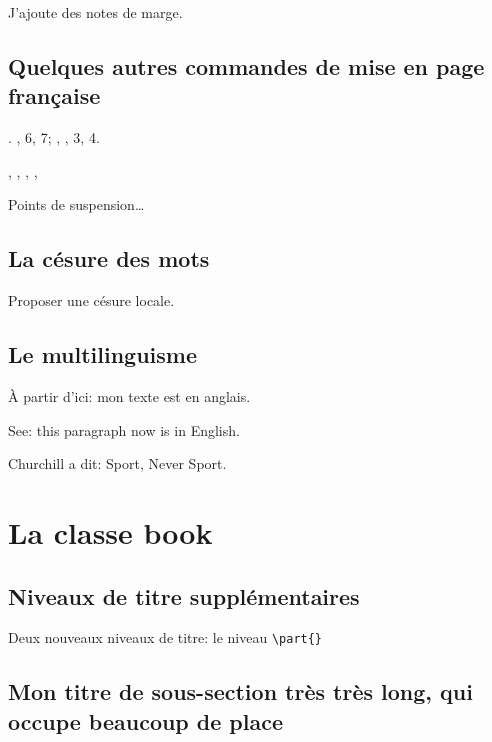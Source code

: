 \documentclass[12pt,a4paper]{book} %
\begin{document}
\reversemarginpar %
J'ajoute des notes de marge.

\subsection{Quelques autres commandes de mise en page française}

. , 6, 7; , , 3, 4.

\primo, \secundo, \tertio, \quarto, 

Points de suspension\dots

\subsection{La césure des mots}

Proposer une césure lo\-cale.


\subsection{Le multilinguisme}

À partir d'ici: mon texte est en anglais.

\begin{otherlanguage}{english}
See: this paragraph now is in English.
\end{otherlanguage}

Churchill a dit:  \foreignlanguage{english}{\og Sport, Never Sport\fg{}}.

\section{La classe book}

\subsection{Niveaux de titre supplémentaires}

Deux nouveaux niveaux de titre: le niveau \verb=\part{}=

\subsection[mon titre court]{Mon titre de sous-section très très long, qui occupe beaucoup de place}
\end{document}
